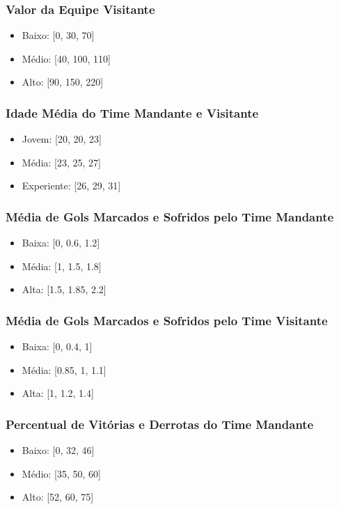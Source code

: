 \documentclass[conference]{IEEEtran}
\begin{document}
\subsubsection{Valor da Equipe Visitante}
\begin{itemize}
    \item Baixo: [0, 30, 70]
    \item Médio: [40, 100, 110]
    \item Alto: [90, 150, 220]
\end{itemize}

\subsubsection{Idade Média do Time Mandante e Visitante}
\begin{itemize}
    \item Jovem: [20, 20, 23]
    \item Média: [23, 25, 27]
    \item Experiente: [26, 29, 31]
\end{itemize}

\subsubsection{Média de Gols Marcados e Sofridos pelo Time Mandante}
\begin{itemize}
    \item Baixa: [0, 0.6, 1.2]
    \item Média: [1, 1.5, 1.8]
    \item Alta: [1.5, 1.85, 2.2]
\end{itemize}

\subsubsection{Média de Gols Marcados e Sofridos pelo Time Visitante}
\begin{itemize}
    \item Baixa: [0, 0.4, 1]
    \item Média: [0.85, 1, 1.1]
    \item Alta: [1, 1.2, 1.4]
\end{itemize}

\subsubsection{Percentual de Vitórias e Derrotas do Time Mandante}
\begin{itemize}
    \item Baixo: [0, 32, 46]
    \item Médio: [35, 50, 60]
    \item Alto: [52, 60, 75]
\end{itemize}
\end{document}
